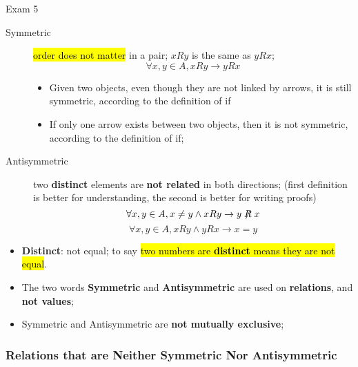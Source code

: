 \documentclass{note}
\begin{document}
\begin{note}{Exam 5}
        \begin{description}
            \item[Symmetric] \hl{order does not matter} in a pair; $ x R y $ is the same as $ y R x $;
            \begin{displaymath}
                \forall x, y \in A, x R y \to y R x
            \end{displaymath}
            \begin{itemize}
                \item Given two objects, even though they are not linked by arrows, it is still symmetric, according to the definition
                of if
                \item If only one arrow exists between two objects, then it is not symmetric, according to the definition of if;
            \end{itemize}

            \item[Antisymmetric] two \textbf{distinct} elements are \textbf{not related} in both directions; (first definition
            is better for understanding, the second is better for writing proofs)
            \begin{displaymath}
                \forall x, y \in A, x \neq y \wedge x R y \to y \not \mathrel{R} x
            \end{displaymath}
            \begin{displaymath}
                \forall x, y \in A, x R y \wedge y R x \to x = y
            \end{displaymath}
        \end{description}

        \begin{itemize}
            \item \textbf{Distinct}: not equal; to say \hl{two numbers are \textbf{distinct} means they are not equal}.
            \item The two words \textbf{Symmetric} and \textbf{Antisymmetric} are used on \textbf{relations}, and \textbf{not values};
            \item Symmetric and Antisymmetric are \textbf{not mutually exclusive};
        \end{itemize}

	\subsubsection{Relations that are Neither Symmetric Nor Antisymmetric}


\end{note}
\end{document}
